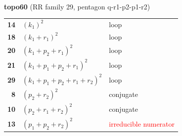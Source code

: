 \documentclass[10pt]{article}
\begin{document}
\begin{minipage}[t]{0.48\textwidth}
{}\\[2mm]\textbf{topo60} (RR family 29, pentagon q-r1-p2-p1-r2)\\[2pt]{\footnotesize\begin{tabular}{@{}r@{\ \ }l@{\ \ }l@{}}\textbf{14} & $(k_1)^2$ & loop\\
\textbf{18} & $(k_1+r_1)^2$ & loop\\
\textbf{20} & $(k_1+p_2+r_1)^2$ & loop\\
\textbf{21} & $(k_1+p_1+p_2+r_1)^2$ & loop\\
\textbf{29} & $(k_1+p_1+p_2+r_1+r_2)^2$ & loop\\
\textbf{8} & $(p_2+r_2)^2$ & conjugate\\
\textbf{10} & $(p_2+r_1+r_2)^2$ & conjugate\\
\textbf{13} & $(p_1+p_2+r_2)^2$ & \textcolor{red}{irreducible numerator}\\\end{tabular}}\end{minipage}

\bigskip
\end{document}
